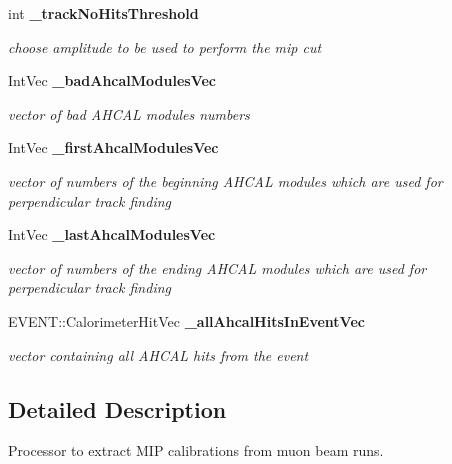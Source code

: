 \begin{DoxyCompactItemize}
\item 
int {\bf \-\_\-track\-No\-Hits\-Threshold}
\begin{DoxyCompactList}\small\item\em choose amplitude to be used to perform the mip cut \end{DoxyCompactList}\item 
Int\-Vec {\bf \-\_\-bad\-Ahcal\-Modules\-Vec}\label{classCALICE_1_1MipTrackFinder_acd8b079f861742d25cc2fcfc6ccfb763}

\begin{DoxyCompactList}\small\item\em vector of bad A\-H\-C\-A\-L modules numbers \end{DoxyCompactList}\item 
Int\-Vec {\bf \-\_\-first\-Ahcal\-Modules\-Vec}\label{classCALICE_1_1MipTrackFinder_adc6d58d6ee59a8530f1a6439bd02ae3d}

\begin{DoxyCompactList}\small\item\em vector of numbers of the beginning A\-H\-C\-A\-L modules which are used for perpendicular track finding \end{DoxyCompactList}\item 
Int\-Vec {\bf \-\_\-last\-Ahcal\-Modules\-Vec}\label{classCALICE_1_1MipTrackFinder_a08397bf4269e486cc906a645b26f5a7c}

\begin{DoxyCompactList}\small\item\em vector of numbers of the ending A\-H\-C\-A\-L modules which are used for perpendicular track finding \end{DoxyCompactList}\item 
E\-V\-E\-N\-T\-::\-Calorimeter\-Hit\-Vec {\bf \-\_\-all\-Ahcal\-Hits\-In\-Event\-Vec}\label{classCALICE_1_1MipTrackFinder_a4c48ff185ec8093624934b9c023d2057}

\begin{DoxyCompactList}\small\item\em vector containing all A\-H\-C\-A\-L hits from the event \end{DoxyCompactList}\end{DoxyCompactItemize}


\subsection{Detailed Description}
Processor to extract M\-I\-P calibrations from muon beam runs. 

